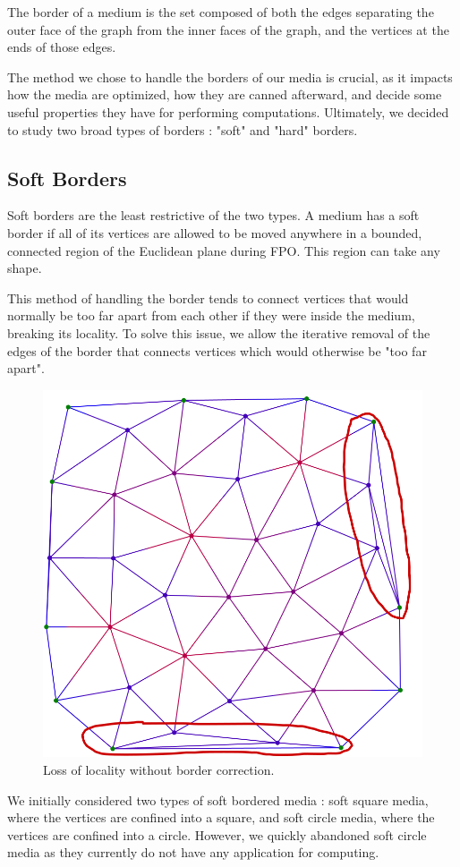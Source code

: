 \documentclass{article}
\begin{document}
The border of a medium is the set composed of both the edges separating the outer face of the graph from the inner faces of the graph, and the vertices at the ends of those edges.

The method we chose to handle the borders of our media is crucial, as it impacts how the media are optimized, how they are canned afterward, and decide some useful properties they have for performing computations. Ultimately, we decided to study two broad types of borders : "soft" and "hard" borders.

\subsection{Soft Borders}

Soft borders are the least restrictive of the two types. A medium has a soft border if all of its vertices are allowed to be moved anywhere in a bounded, connected region of the Euclidean plane during FPO. This region can take any shape.

This method of handling the border tends to connect vertices that would normally be too far apart from each other if they were inside the medium, breaking its locality. To solve this issue, we allow the iterative removal of the edges of the border that connects vertices which would otherwise be "too far apart".

\begin{figure}[h]
	\centering\includegraphics[width=0.45\linewidth]{assets/softBorder_lossOfLocality.png}
	\caption{
		Loss of locality without border correction.
	}
	\label{fig:softLossLocality}
\end{figure}

We initially considered two types of soft bordered media : soft square media, where the vertices are confined into a square, and soft circle media, where the vertices are confined into a circle. However, we quickly abandoned soft circle media as they currently do not have any application for computing.
\end{document}
